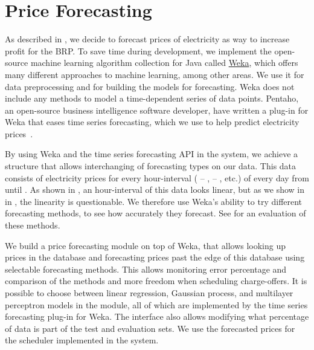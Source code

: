 \section{Price Forecasting}\label{sec:priceforecasting}
As described in , we decide to forecast prices of electricity as way to increase profit for the BRP. To save time during development, we implement the open-source machine learning algorithm collection for Java called \href{http://www.cs.waikato.ac.nz/ml/weka/}{Weka}, which offers many different approaches to machine learning, among other areas. We use it for data preprocessing and for building the models for forecasting. Weka does not include any methods to model a time-dependent series of data points. Pentaho, an open-source business intelligence software developer, have written a plug-in for Weka that eases time series forecasting, which we use to help predict electricity prices~\cite{pentahoTSF}.

By using Weka and the time series forecasting API in the system, we achieve a structure that allows interchanging of forecasting types on our data. This data consists of electricity prices for every hour-interval ( -- ,  -- , etc.) of every day from \protect{} until \protect{}. As shown in , an hour-interval of this data looks linear, but as we show in  in , the linearity is questionable. We therefore use Weka's ability to try different forecasting methods, to see how accurately they forecast. See  for an evaluation of these methods.

We build a price forecasting module on top of Weka, that allows looking up prices in the database and forecasting prices past the edge of this database using selectable forecasting methods. This allows monitoring error percentage and comparison of the methods and more freedom when scheduling charge-offers. It is possible to choose between linear regression, Gaussian process, and multilayer perceptron models in the module, all of which are implemented by the time series forecasting plug-in for Weka. The interface also allows modifying what percentage of data is part of the test and evaluation sets. We use the forecasted prices for the scheduler implemented in the system.
